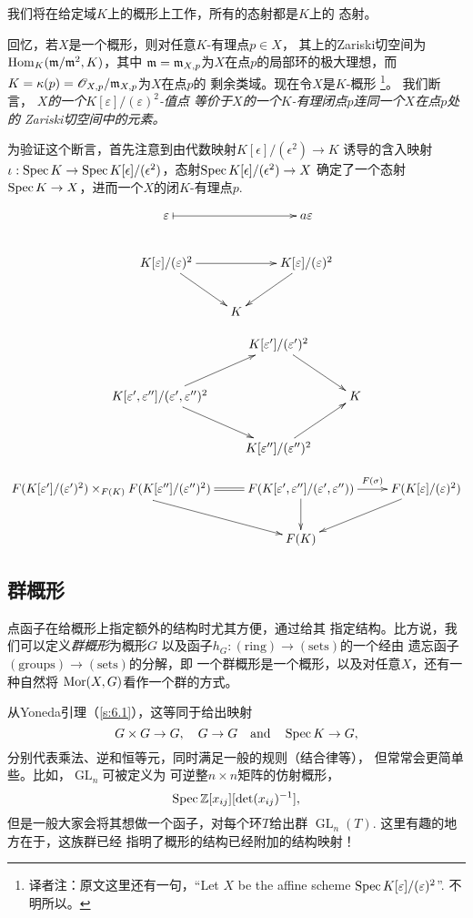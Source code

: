 我们将在给定域$K$上的概形上工作，所有的态射都是$K$上的
态射。

回忆，若$X$是一个概形，则对任意$K$-有理点$p\in X$，
其上的Zariski切空间为$\operatorname{Hom}_K(\mathfrak{m}/\mathfrak{m}^2,K)$，其中
$\mathfrak{m}=\mathfrak{m}_{X,p}$为$X$在点$p$的局部环的极大理想，而
$K=\kappa(p)=\mathscr O_{X,p}/\mathfrak{m}_{X,p}$为$X$在点$p$的
剩余类域。现在令$X$是$K$-概形%
\footnote{译者注：原文这里还有一句，“Let $X$ be the
affine scheme $\operatorname{Spec} K[\varepsilon]/(\varepsilon)^2$”.
不明所以。}。%
我们断言，
\textit{$X$的一个$K[\varepsilon]/(\varepsilon)^2$-值点
等价于$X$的一个$K$-有理闭点$p$连同一个$X$在点$p$处的
Zariski切空间中的元素。}


为验证这个断言，首先注意到由代数映射$K[\epsilon]/(\epsilon^2)
\to K$ 诱导的含入映射$\iota :\operatorname{Spec} K\to \operatorname{Spec} K[\epsilon]/
(\epsilon^2)$，态射$\operatorname{Spec} K[\epsilon]/(\epsilon^2)\to X$
确定了一个态射$\operatorname{Spec} K\to X$，进而一个$X$的闭$K$-有理点$p$.

\[
	\xymatrix{
	\varepsilon \ar@{|->}[rr] &  & a\varepsilon\\
	K[\varepsilon]/(\varepsilon)^2 \ar[rr]\ar[rd]& & K[\varepsilon]/(\varepsilon)^2 \ar[ld]\\
	& K &
	}
\]


\[
	\xymatrix{
	& K[\varepsilon']/(\varepsilon')^2 \ar[rd] &\\
	K[\varepsilon',\varepsilon'']/(\varepsilon',\varepsilon'')^2 \ar[ru]\ar[rd]& & K\\
	& K[\varepsilon'']/(\varepsilon'')^2 \ar[ru] &
	}
\]

\[
	\xymatrix{
	F(K[\varepsilon']/(\varepsilon')^2)\times_{F(K)} F(K[\varepsilon'']/(\varepsilon'')^2)\ar[rd]\ar@{=}[r]&F(K[\varepsilon',\varepsilon'']/(\varepsilon',\varepsilon'')) \ar[r]^-{F(\sigma)}\ar[d]& F(K[\varepsilon]/(\varepsilon)^2)\ar[ld]\\
	& F(K) &
	}
\]

\subsection{群概形} \label{s:6.1.4}

点函子在给概形上指定额外的结构时尤其方便，通过给其
指定结构。比方说，我们可以定义\textit{群概形}为概形$G$
以及函子$h_G:(\text{ring})\to (\text{sets})$的一个经由
遗忘函子$(\text{groups})\to (\text{sets})$的分解，即
一个群概形是一个概形，以及对任意$X$，还有一种自然将
$\operatorname{Mor}(X,G)$看作一个群的方式。

从Yoneda引理（\ref{s:6.1}），这等同于给出映射
\[
	G\times G\to G,\quad G\to G\quad \text{and}
	\quad \operatorname{Spec} K\to G,
\]
分别代表乘法、逆和恒等元，同时满足一般的规则（结合律等），
但常常会更简单些。比如，$\operatorname{GL}_n$可被定义为
可逆整$n\times n$矩阵的仿射概形，
\[
	\operatorname{Spec} \mathbb{Z}[x_{ij}][\det (x_{ij})^{-1}],
\]
但是一般大家会将其想做一个函子，对每个环$T$给出群
$\operatorname{GL}_n(T)$. 这里有趣的地方在于，这族群已经
指明了概形的结构已经附加的结构映射！
